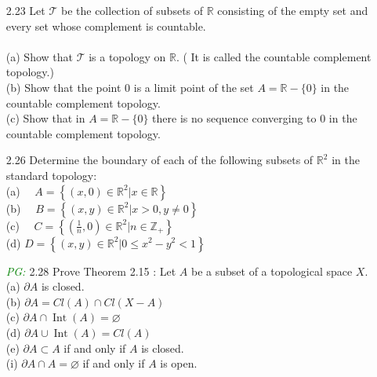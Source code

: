 \documentclass[12pt]{article}
\newcommand{\R}{\mathbb{R}}
\newcommand{\pg}{\textit{\textcolor{green}{PG: }}}
\begin{document}
	\begin{enumerate}
		
		\item[2.23] Let $\mathcal{T}$ be the collection of subsets of $\mathbb{R}$ consisting of the empty set and every set whose complement is countable.\\
		\\
		(a) Show that $\mathcal{T}$ is a topology on $\R$. ( It is called the countable complement topology.)\\
		(b) Show that the point 0 is a limit point of the set $A=\mathbb{R}-\{0\}$ in the countable complement topology.\\
		(c) Show that in $A=\R-\{0\}$ there is no sequence converging to 0 in the countable complement topology.\\
		
		\item[2.26] Determine the boundary of each of the following subsets of $\mathbb{R}^{2}$ in the standard topology:\\
		(a) $\quad A=\left\{(x, 0) \in \mathbb{R}^{2} | x \in \mathbb{R}\right\}$\\
		
		(b) $\quad B=\left\{(x, y) \in \mathbb{R}^{2} | x>0, y \neq 0\right\}$\\
		
		(c) $\quad C=\left\{\left(\frac{1}{n}, 0\right) \in \mathbb{R}^{2} | n \in \mathbb{Z}_{+}\right\}$\\
		
		(d) $D=\left\{(x, y) \in \mathbb{R}^{2} | 0 \leq x^{2}-y^{2}<1\right\}$\\
		
		\item[\pg2.28] Prove Theorem 2.15 : Let $A$ be a subset of a topological space $X .$\\
		(a) $\partial A$ is closed.\\
		
		(b) $\partial A=Cl(A) \cap Cl(X-A)$\\
		
		(c) $\partial A \cap \operatorname{Int}(A)=\varnothing$\\
		
		(d) $\partial A \cup \operatorname{Int}(A)=C l(A)$\\
		
		(e) $\partial A \subset A$ if and only if $A$ is closed.\\
		
		(i) $\partial A \cap A=\varnothing$ if and only if $A$ is open.\\
		

\end{enumerate}
\end{document}
